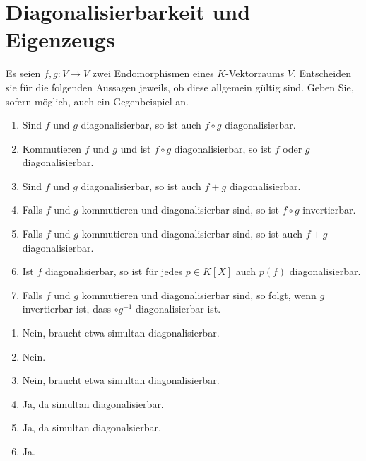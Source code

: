 \section{Diagonalisierbarkeit und Eigenzeugs}


\begin{question}
  Es seien $f, g \colon V \to V$ zwei Endomorphismen eines $K$-Vektorraums $V$.
  Entscheiden sie für die folgenden Aussagen jeweils, ob diese allgemein gültig sind.
  Geben Sie, sofern möglich, auch ein Gegenbeispiel an.
  \begin{enumerate}[leftmargin=*]
    \item
      Sind $f$ und $g$ diagonalisierbar, so ist auch $f \circ g$ diagonalisierbar.
    \item
      Kommutieren $f$ und $g$ und ist $f \circ g$ diagonalisierbar, so ist $f$ oder $g$ diagonalisierbar.
    \item
      Sind $f$ und $g$ diagonalisierbar, so ist auch $f + g$ diagonalisierbar.
    \item
      Falls $f$ und $g$ kommutieren und diagonalisierbar sind, so ist $f \circ g$ invertierbar.
    \item
      Falls $f$ und $g$ kommutieren und diagonalisierbar sind, so ist auch $f + g$ diagonalisierbar.
    \item
      Ist $f$ diagonalisierbar, so ist für jedes $p \in K[X]$ auch $p(f)$ diagonalisierbar.
    \item
      Falls $f$ und $g$ kommutieren und diagonalisierbar sind, so folgt, wenn $g$ invertierbar ist, dass $ \circ g^{-1}$ diagonalisierbar ist.
  \end{enumerate}
\end{question}

\begin{solution}
  \begin{enumerate}
    \item
      Nein, braucht etwa simultan diagonalisierbar.
    \item
      Nein.
    \item
      Nein, braucht etwa simultan diagonalisierbar.
    \item
      Ja, da simultan diagonalisierbar.
    \item
      Ja, da simultan diagonalsierbar.
    \item
      Ja.
  \end{enumerate}
\end{solution}


